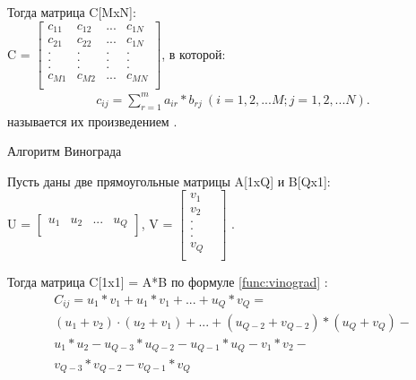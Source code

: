 \documentclass[a4paper,12pt]{report}
\begin{document}
			\vspace{0.3cm}
			Тогда матрица C[MxN]:\\
			C = $\begin{bmatrix}
				c_{11}& c_{12}& ...& c_{1N}\\
				c_{21}& c_{22}& ...& c_{1N}\\
				.& .& .& .\\
				.& .& .& .\\
				.& .& .& .\\
				c_{M1}& c_{M2}& ...& c_{MN}\\
			\end{bmatrix}$, в которой:\\
			
			\vspace{0.3cm}
			\begin{multline}
				\label{func:std}
				c_{ij} = \sum\limits_{r=1}^m a_{ir}*b_{rj} \ (i=1,2,...M; j=1,2,...N).
			\end{multline} называется их произведением \cite{Beloysov}.\\
			
			\vspace{0.6cm}
			
			\begin{center}
				Алгоритм Винограда
			\end{center}
		
			Пусть даны две прямоугольные матрицы A[1xQ] и B[Qx1]:\\
			U = $\begin{bmatrix}
			u_{1}& u_{2}& ...& u_{Q}\\
			\end{bmatrix}$, V = $\begin{bmatrix}
			v_{1}\\
			v_{2}\\
			.&\\
			.&\\
			.&\\
			v_{Q}\\
			\end{bmatrix}$ .
			
			\vspace{0.3cm}
			Тогда матрица C[1x1] = A*B по формуле \ref{func:vinograd} \cite{Gall2012}:\\
			\begin{multline}
				\label{func:vinograd}
				C_{ij} = u_{1}*v_{1}+u_{1}*v_{1}+...+u_{Q}*v_{Q} =\\ (u_{1}+v_{2})\cdot(u_{2}+v_{1})+...+(u_{Q-2}+v_{Q-2})*(u_{Q}+v_{Q})-\\
				u_{1}*u_{2}-u_{Q-3}*u_{Q-2}-u_{Q-1}*u_{Q}-v_{1}*v_{2}-\\
				v_{Q-3}*v_{Q-2}-v_{Q-1}*v_{Q}
			\end{multline}
			
\end{document}
